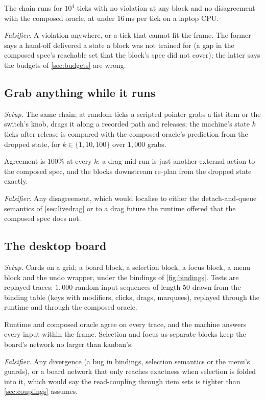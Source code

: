 \begin{prediction}
\label{pred:chain}
The chain runs for $10^4$ ticks with no violation at any block and no disagreement with the composed oracle,
at under $16$\,ms per tick on a laptop CPU.
\end{prediction}
\emph{Falsifier.} A violation anywhere, or a tick that cannot fit the frame. The former says a hand-off delivered
a state a block was not trained for (a gap in the composed spec's reachable set that the block's spec did not
cover); the latter says the budgets of \cref{sec:budgets} are wrong.

\subsection{Grab anything while it runs}
\label{sec:demo-grab}

\emph{Setup.} The same chain; at random ticks a scripted pointer grabs a list item or the switch's knob, drags
it along a recorded path and releases; the machine's state $k$ ticks after release is compared with the
composed oracle's prediction from the dropped state, for $k\in\{1,10,100\}$ over $1{,}000$ grabs.

\begin{prediction}
\label{pred:grab}
Agreement is $100\%$ at every $k$: a drag mid-run is just another external action to the composed spec, and the
blocks downstream re-plan from the dropped state exactly.
\end{prediction}
\emph{Falsifier.} Any disagreement, which would localise to either the detach-and-queue semantics of
\cref{sec:livedrag} or to a drag future the runtime offered that the composed spec does not.

\subsection{The desktop board}
\label{sec:demo-board}

\emph{Setup.} Cards on a grid; a board block, a selection block, a focus block, a menu block and the undo
wrapper, under the bindings of \cref{fig:bindings}. Tests are replayed traces: $1{,}000$ random input sequences
of length $50$ drawn from the binding table (keys with modifiers, clicks, drags, marquees), replayed through the
runtime and through the composed oracle.

\begin{prediction}
\label{pred:board}
Runtime and composed oracle agree on every trace, and the machine answers every input within the frame.
Selection and focus as separate blocks keep the board's network no larger than kanban's.
\end{prediction}
\emph{Falsifier.} Any divergence (a bug in bindings, selection semantics or the menu's guards), or a board
network that only reaches exactness when selection is folded into it, which would say the read-coupling
through item sets is tighter than \cref{sec:couplings} assumes.

